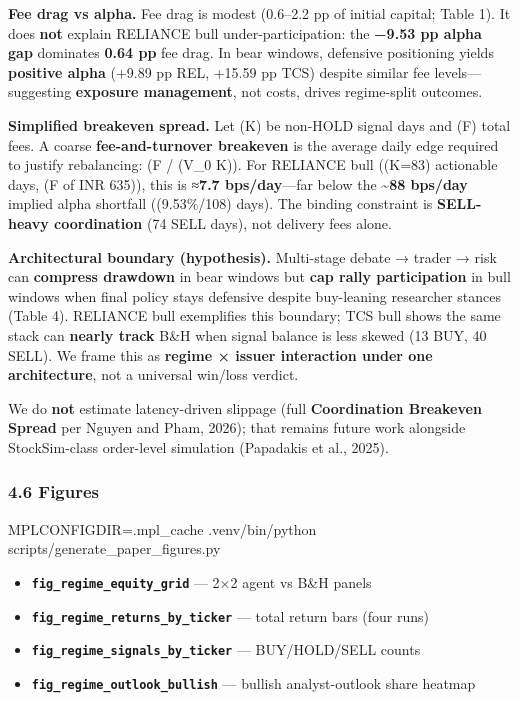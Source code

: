 \documentclass[
]{article}
\newenvironment{Shaded}{}{}
\newcommand{\ExtensionTok}[1]{#1}
\newcommand{\NormalTok}[1]{#1}
\newcommand{\OperatorTok}[1]{\textcolor[rgb]{0.40,0.40,0.40}{#1}}
\newcommand{\VariableTok}[1]{\textcolor[rgb]{0.10,0.09,0.49}{#1}}
\providecommand{\tightlist}{%
  \setlength{\itemsep}{0pt}\setlength{\parskip}{0pt}}
\begin{document}
\textbf{Fee drag vs alpha.} Fee drag is modest (0.6--2.2 pp of initial
capital; Table 1). It does \textbf{not} explain RELIANCE bull
under-participation: the \textbf{−9.53 pp alpha gap} dominates
\textbf{0.64 pp} fee drag. In bear windows, defensive positioning yields
\textbf{positive alpha} (+9.89 pp REL, +15.59 pp TCS) despite similar
fee levels---suggesting \textbf{exposure management}, not costs, drives
regime-split outcomes.

\textbf{Simplified breakeven spread.} Let (K) be non-HOLD signal days
and (F) total fees. A coarse \textbf{fee-and-turnover breakeven} is the
average daily edge required to justify rebalancing: (F / (V\_0
\cdot K)). For RELIANCE bull ((K=83) actionable days, (F of INR 635)), this
is ≈\textbf{7.7 bps/day}---far below the \textbf{\textasciitilde88
bps/day} implied alpha shortfall ((9.53\%/108) days). The binding
constraint is \textbf{SELL-heavy coordination} (74 SELL days), not
delivery fees alone.

\textbf{Architectural boundary (hypothesis).} Multi-stage debate →
trader → risk can \textbf{compress drawdown} in bear windows but
\textbf{cap rally participation} in bull windows when final policy stays
defensive despite buy-leaning researcher stances (Table 4). RELIANCE
bull exemplifies this boundary; TCS bull shows the same stack can
\textbf{nearly track} B\&H when signal balance is less skewed (13 BUY,
40 SELL). We frame this as \textbf{regime × issuer interaction under one
architecture}, not a universal win/loss verdict.

We do \textbf{not} estimate latency-driven slippage (full
\textbf{Coordination Breakeven Spread} per Nguyen and Pham, 2026); that
remains future work alongside StockSim-class order-level simulation
(Papadakis et al., 2025).

\subsubsection{4.6 Figures}\label{figures}

\begin{Shaded}
\begin{Highlighting}[]
\VariableTok{MPLCONFIGDIR}\OperatorTok{=}\NormalTok{.mpl\_cache }\ExtensionTok{.venv/bin/python}\NormalTok{ scripts/generate\_paper\_figures.py}
\end{Highlighting}
\end{Shaded}

\begin{itemize}
\tightlist
\item
  \textbf{\texttt{fig\_regime\_equity\_grid}} --- 2×2 agent vs B\&H
  panels\\
\item
  \textbf{\texttt{fig\_regime\_returns\_by\_ticker}} --- total return
  bars (four runs)\\
\item
  \textbf{\texttt{fig\_regime\_signals\_by\_ticker}} --- BUY/HOLD/SELL
  counts\\
\item
  \textbf{\texttt{fig\_regime\_outlook\_bullish}} --- bullish
  analyst-outlook share heatmap
\end{itemize}
\end{document}
